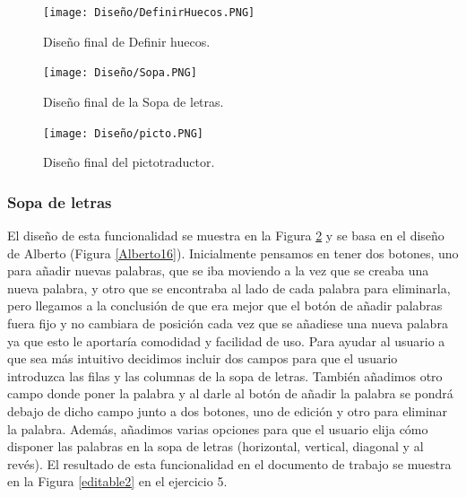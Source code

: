 \begin{figure}[ht!]
  \centering
  \texttt{[image: Diseño/DefinirHuecos.PNG]}
  \caption{Diseño final de Definir huecos.}
  \label{definir_hueco}
\end{figure}

\begin{figure}[ht!]
  \centering
  \texttt{[image: Diseño/Sopa.PNG]}
  \caption{Diseño final de la Sopa de letras.}
  \label{sopaLetras}
\end{figure}

\begin{figure}[ht!]
  \centering
  \texttt{[image: Diseño/picto.PNG]}
  \caption{Diseño final del pictotraductor.}
  \label{pictotraductor}
\end{figure}
\subsubsection{Sopa de letras}
El diseño de esta funcionalidad se muestra en la Figura \ref{sopaLetras} y se basa en el diseño de Alberto (Figura \ref{Alberto16}). Inicialmente pensamos en tener dos botones, uno para añadir nuevas palabras, que se iba moviendo a la vez que se creaba una nueva palabra, y otro que se encontraba al lado de cada palabra para eliminarla, pero llegamos a la conclusión
de que era mejor que el botón de añadir palabras fuera fijo y no cambiara de posición cada vez que se añadiese una nueva palabra ya que esto le aportaría comodidad y facilidad de uso. Para ayudar al usuario a que sea más intuitivo decidimos incluir dos campos para que el usuario introduzca las filas y las columnas de la sopa de letras. También añadimos otro campo donde poner la palabra y al darle al botón de añadir la palabra se pondrá debajo de dicho campo junto a dos botones, uno de edición y otro para eliminar la palabra. Además, añadimos varias opciones para que el usuario elija cómo disponer las palabras en la sopa de letras (horizontal, vertical, diagonal y al revés). El resultado de esta funcionalidad en el documento de trabajo se muestra en la Figura \ref{editable2} en el ejercicio 5.



